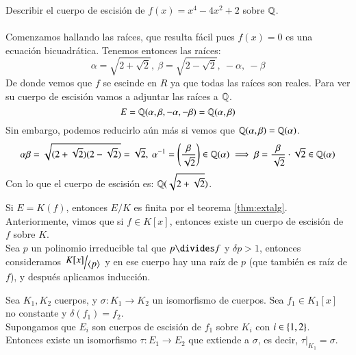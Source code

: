 \begin{ex}
    Describir el cuerpo de escisión de $f(x) = x^4 - 4x^2 + 2$ sobre $\mathbb{Q}$.\\\\
    Comenzamos hallando las raíces, que resulta fácil pues $f(x) = 0$ es una ecuación bicuadrática. Tenemos entonces las raíces:
    $$
        \alpha = \sqrt{2 + \sqrt 2},\ \beta = \sqrt{2 - \sqrt{2}},\ -\alpha,\ -\beta
    $$
    De donde vemos que $f$ se escinde en $R$ ya que todas las raíces son reales. Para ver su cuerpo de escisión vamos a adjuntar las raíces a $\mathbb{Q}$.
    $$
        E = \mathbb{Q}(\alpha,  \beta, -\alpha, -\beta) = \mathbb{Q}(\alpha, \beta)
    $$
    Sin embargo, podemos reducirlo aún más si vemos que $\mathbb{Q}(\alpha, \beta) = \mathbb{Q}(\alpha)$.
    $$
        \alpha\beta = \sqrt{(2 + \sqrt 2)(2 - \sqrt 2)} = \sqrt 2,\ \alpha^{-1} = \left(\frac{\beta}{\sqrt 2}\right) \in \mathbb{Q}(\alpha) \implies \beta = \frac{\beta}{\sqrt 2} \cdot \sqrt 2 \in \mathbb{Q}(\alpha)
    $$
    Con lo que el cuerpo de escisión es: $\mathbb{Q}(\sqrt{2 + \sqrt 2})$.
\end{ex}

\begin{obs}
    Si $E = K(f)$, entonces $E/K$ es finita por el teorema \ref{thm:extalg}. Anteriormente, vimos que si $f \in K[x]$, entonces existe un cuerpo de escisión de $f$ sobre $K$.\\
    Sea $p$ un polinomio irreducible tal que $p \divides f$ y $\delta p > 1$, entonces consideramos $\quo{K[x]}{\gen{p}}$ y en ese cuerpo hay una raíz de $p$ (que también es raíz de $f$), y después aplicamos inducción.
\end{obs}

\begin{thm}\label{thm:3.5}
    Sea $K_1, K_2$ cuerpos, y $\sigma: K_1 \to K_2$ un isomorfismo de cuerpos. Sea $f_1 \in K_1[x]$ no constante y $\delta(f_1) = f_2$.\\ Supongamos que $E_i$ son cuerpos de escisión de $f_1$ sobre $K_i$ con $i \in \left\{1, 2\right\}$. Entonces existe un isomorfismo $\tau: E_1 \to E_2$ que extiende a $\sigma$, es decir, $\left. \tau \right|_{K_1} = \sigma$.
\end{thm}

